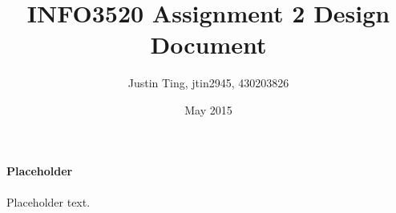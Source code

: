 \documentclass[12pt]{article}
\title{INFO3520 Assignment 2 Design Document}
\author{Justin Ting, jtin2945, 430203826}
\date{May 2015}
\begin{document}
\maketitle

\textbf{Placeholder}\\\\
Placeholder text.\\
\end{document}
